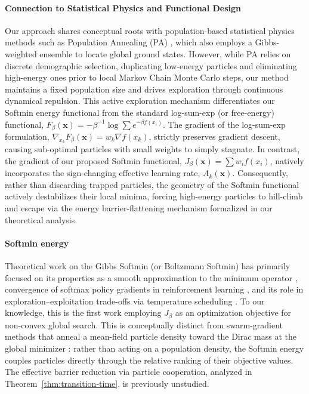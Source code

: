 \documentclass{article} %
\theoremstyle{plain}
\theoremstyle{definition}
\theoremstyle{remark}
\newcommand{\prefactor}[2]{A_{#1}(#2)}
\newcommand{\xx}{\mathbf{x}}
\begin{document}
\paragraph{Connection to Statistical Physics and Functional Design}
Our approach shares conceptual roots with population-based statistical physics methods such as Population Annealing (PA) \citep{Wang_2015}, which also employs a Gibbs-weighted ensemble to locate global ground states. However, while PA relies on discrete demographic selection, duplicating low-energy particles and eliminating high-energy ones prior to local Markov Chain Monte Carlo steps, our method maintains a fixed population size and drives exploration through continuous dynamical repulsion. This active exploration mechanism differentiates our Softmin energy functional from the standard log-sum-exp (or free-energy) functional, $F_\beta(\xx) = -{\beta}^{-1} \log \sum e^{-\beta f(x_i)}$. The gradient of the log-sum-exp formulation, $\nabla_{x_k} F_\beta(\xx) = w_k \nabla f(x_k)$, strictly preserves gradient descent, causing sub-optimal particles with small weights to simply stagnate. In contrast, the gradient of our proposed Softmin functional, $J_\beta(\xx) = \sum w_i f(x_i)$, natively incorporates the sign-changing effective learning rate, $\prefactor{k}{\xx}$. Consequently, rather than discarding trapped particles, the geometry of the Softmin functional actively destabilizes their local minima, forcing high-energy particles to hill-climb and escape via the energy barrier-flattening mechanism formalized in our theoretical analysis.

\paragraph{Softmin energy} Theoretical work on the Gibbs Softmin (or Boltzmann Softmin) has primarily focused on its properties as a smooth approximation to the minimum operator \citep{bertsekas1999nonlinear}, convergence of softmax policy gradients in reinforcement learning \citep{mei2020global}, and its role in exploration–exploitation trade-offs via temperature scheduling \citep{song2019revisiting}. To our knowledge, this is the first work employing $J_\beta$ as an optimization objective for non-convex global search. This is conceptually distinct from swarm-gradient methods that anneal a mean-field particle density toward the Dirac mass at the global minimizer \citep{bolte2024swarm}: rather than acting on a population density, the Softmin energy couples particles directly through the relative ranking of their objective values. The effective barrier reduction via particle cooperation, analyzed in Theorem~\ref{thm:transition-time}, is previously unstudied.
\end{document}
